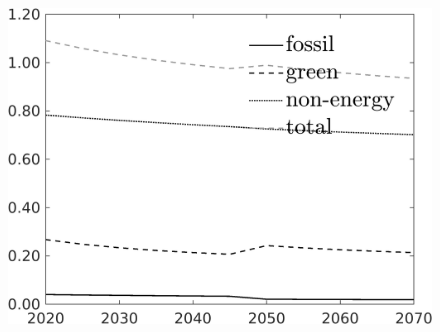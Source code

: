 \begin{figure}[h!!]
\begin{minipage}[]{0.32\textwidth}
	\end{minipage}
	\begin{minipage}[]{0.32\textwidth}
		\includegraphics[width=1\textwidth]{../../codding_model/own_basedOnFried/optimalPol_190722_tidiedUp/figures/all_Aout22/SingleJointTOT_regime3_OPT_T_NoTaus_Science_spillover0_noskill0_sep1_xgrowth0_extern0_PV1_etaa0.79_lgd1.png}
	\end{minipage}
	\begin{minipage}[]{0.32\textwidth}

\end{minipage}
\end{figure}
